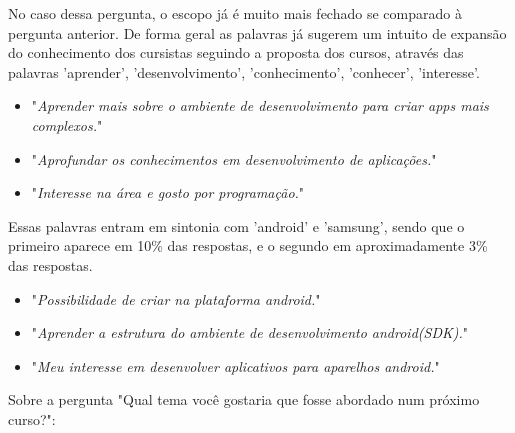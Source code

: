 No caso dessa pergunta, o escopo já é muito mais fechado se comparado à pergunta anterior. De forma geral as palavras já sugerem um intuito de expansão do conhecimento dos cursistas seguindo a proposta dos cursos, através das palavras 'aprender', 'desenvolvimento', 'conhecimento', 'conhecer', 'interesse'.

\begin{itemize}
\item "\textit{Aprender mais sobre o ambiente de desenvolvimento para criar apps mais complexos.}"
\item "\textit{Aprofundar os conhecimentos em desenvolvimento de aplicações.}"
\item "\textit{Interesse na área e gosto por programação.}"
\end{itemize}

Essas palavras entram em sintonia com 'android' e 'samsung', sendo que o primeiro aparece em 10\% das respostas, e o segundo em aproximadamente 3\% das respostas. 

\begin{itemize}
\item "\textit{Possibilidade de criar na plataforma android.}"
\item "\textit{Aprender a estrutura do ambiente de desenvolvimento android(SDK).}"
\item "\textit{Meu interesse em desenvolver aplicativos para aparelhos android.}"
\end{itemize}


Sobre a pergunta "Qual tema você gostaria que fosse abordado num próximo curso?":

